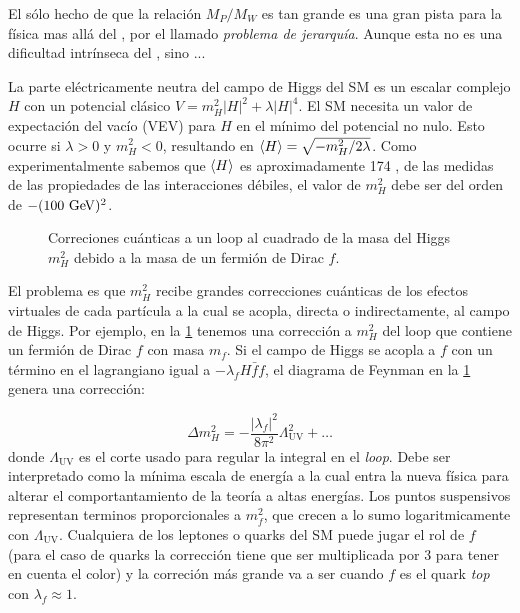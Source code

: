 El s\'olo hecho de que la relación $M_P/M_W$ es tan grande es una gran pista
para la física mas allá del {\SM}, por el llamado \emph{problema de jerarquía}.
Aunque esta  no es una dificultad intrínseca del {\SM},  sino ...

La parte eléctricamente neutra del campo de Higgs del SM es un escalar complejo $H$ con
un potencial clásico $V=m_H^2 |H|^2 + \lambda|H|^4$.
El SM necesita un valor de expectación del vacío (VEV) para $H$ en el
mínimo del potencial no nulo.
Esto ocurre si $\lambda>0$ y $m_H^2<0$, resultando en
$\langle H \rangle = \sqrt{-m_H^2/2\lambda}$.
Como experimentalmente sabemos que $\langle H \rangle$ es aproximadamente 174 \gev,
de las medidas de las propiedades de las interacciones débiles, el valor de
$m_H^2$ debe ser del orden de $-(100 \gev)^2$.

\begin{figure}[h]
  \centering
  
  \caption{Correciones cu\'anticas a un loop al cuadrado de la masa del Higgs $m_H^2$ debido a la
    masa de un fermi\'on de Dirac $f$.}\label{fig:higgs_correction_f}
\end{figure}

El problema es que $m_H^2$ recibe grandes correcciones cuánticas de los efectos virtuales de cada
partícula a la cual se acopla, directa o indirectamente, al campo de Higgs. Por ejemplo, en la
\cref{fig:higgs_correction_f} tenemos una corrección a $m_H^2$ del loop
que contiene un fermión de Dirac $f$ con masa $m_f$. Si el campo de Higgs se acopla a $f$ con un
término en el lagrangiano igual a $-\lambda_f H \bar{f}f$, el diagrama de Feynman en la
\cref{fig:higgs_correction_f} genera una corrección:

\begin{equation}
  \Delta m_H^2 = -\frac{|\lambda_f|^2}{8\pi^2} \Lambda^2_\text{UV} + \ldots
  \label{eq:higgs_corr_f}
\end{equation}
%
donde $\Lambda_\text{UV}$ es el corte usado para regular la integral en el \emph{loop}.
Debe ser interpretado como la m\'inima escala de energ\'ia a la cual entra la nueva física para
alterar el comportantamiento de la teoría a altas energías. Los puntos suspensivos representan
terminos proporcionales a $m_f^2$, que crecen a lo sumo logaritmicamente con $\Lambda_\text{UV}$.
Cualquiera de los leptones o quarks del SM puede jugar el rol de $f$ (para el caso de quarks
la correcci\'on tiene que ser multiplicada por 3 para tener en cuenta el color) y
la correci\'on m\'as grande va a ser cuando $f$ es el quark \emph{top} con $\lambda_f \approx 1$.

